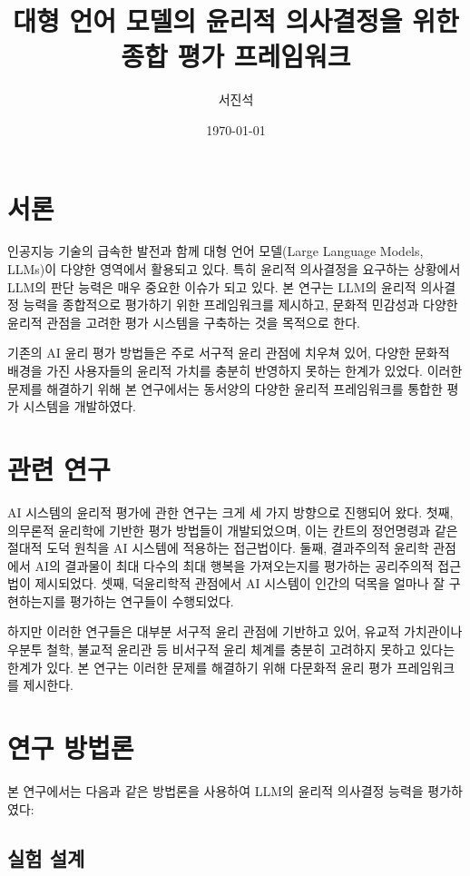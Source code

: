 \documentclass[11pt,a4paper]{article}
\title{대형 언어 모델의 윤리적 의사결정을 위한 종합 평가 프레임워크}
\author{서진석}
\date{\today}
\begin{document}
\maketitle

\section{서론}

인공지능 기술의 급속한 발전과 함께 대형 언어 모델(Large Language Models, LLMs)이 다양한 영역에서 활용되고 있다. 특히 윤리적 의사결정을 요구하는 상황에서 LLM의 판단 능력은 매우 중요한 이슈가 되고 있다. 본 연구는 LLM의 윤리적 의사결정 능력을 종합적으로 평가하기 위한 프레임워크를 제시하고, 문화적 민감성과 다양한 윤리적 관점을 고려한 평가 시스템을 구축하는 것을 목적으로 한다.

기존의 AI 윤리 평가 방법들은 주로 서구적 윤리 관점에 치우쳐 있어, 다양한 문화적 배경을 가진 사용자들의 윤리적 가치를 충분히 반영하지 못하는 한계가 있었다. 이러한 문제를 해결하기 위해 본 연구에서는 동서양의 다양한 윤리적 프레임워크를 통합한 평가 시스템을 개발하였다.

\section{관련 연구}

AI 시스템의 윤리적 평가에 관한 연구는 크게 세 가지 방향으로 진행되어 왔다. 첫째, 의무론적 윤리학에 기반한 평가 방법들이 개발되었으며, 이는 칸트의 정언명령과 같은 절대적 도덕 원칙을 AI 시스템에 적용하는 접근법이다. 둘째, 결과주의적 윤리학 관점에서 AI의 결과물이 최대 다수의 최대 행복을 가져오는지를 평가하는 공리주의적 접근법이 제시되었다. 셋째, 덕윤리학적 관점에서 AI 시스템이 인간의 덕목을 얼마나 잘 구현하는지를 평가하는 연구들이 수행되었다.

하지만 이러한 연구들은 대부분 서구적 윤리 관점에 기반하고 있어, 유교적 가치관이나 우분투 철학, 불교적 윤리관 등 비서구적 윤리 체계를 충분히 고려하지 못하고 있다는 한계가 있다. 본 연구는 이러한 문제를 해결하기 위해 다문화적 윤리 평가 프레임워크를 제시한다.

\section{연구 방법론}

본 연구에서는 다음과 같은 방법론을 사용하여 LLM의 윤리적 의사결정 능력을 평가하였다:

\subsection{실험 설계}
\end{document}
